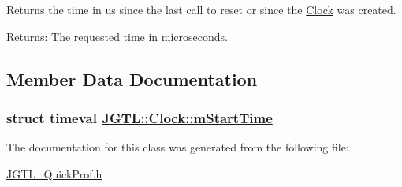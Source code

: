 Returns the time in us since the last call to reset or since the \hyperlink{class_j_g_t_l_1_1_clock}{Clock} was created.

\begin{Desc}
\item[Returns:]The requested time in microseconds. \end{Desc}


\subsection{Member Data Documentation}
\hypertarget{class_j_g_t_l_1_1_clock_b966f80f2c6e5201f2791b1872b2db7d}{
\subsubsection[mStartTime]{\setlength{\rightskip}{0pt plus 5cm}struct timeval \hyperlink{class_j_g_t_l_1_1_clock_b966f80f2c6e5201f2791b1872b2db7d}{JGTL::Clock::m\-Start\-Time}}}
\label{class_j_g_t_l_1_1_clock_b966f80f2c6e5201f2791b1872b2db7d}




The documentation for this class was generated from the following file:\begin{CompactItemize}
\item 
\hyperlink{_j_g_t_l___quick_prof_8h}{JGTL\_\-Quick\-Prof.h}\end{CompactItemize}
